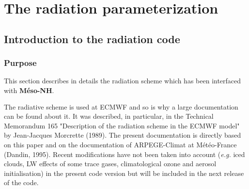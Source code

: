%
%
\chapter{The radiation parameterization}\label{RADIATIONS}
\minitoc
%
\section{Introduction to the radiation code}
%
\subsection{Purpose}
%

This section describes in details the radiation scheme which has been interfaced
with {\bf M\'eso-NH}.

The radiative scheme\footnotemark
%
%
is used at ECMWF and so is why a large documentation can be found about it.
It was described, in particular, in the Technical Memorandum 165 "Description of
the radiation scheme in the ECMWF model" by Jean-Jacques Morcrette
(1989).  The present documentation is directly based on this paper and on the
documentation of ARPEGE-Climat at M\'et\'eo-France (Dandin, 1995). Recent
modifications have not been taken into account ({\it e.g.} iced clouds, LW
effects of some trace gases, climatological ozone and aerosol initialisation)
in the present code version but will be included in the next release of the
code.\\

